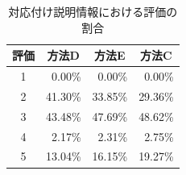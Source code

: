 \documentclass[submit]{ipsj}
\begin{document}

\begin{table}[t]
  \caption{対応付け説明情報における評価の割合}
  \label{table:対応付け説明情報における評価の割合}
  \centering
  \begin{tabular}{c|r|r|r}
  \hline
  評価 & \multicolumn{1}{c|}{方法D} & \multicolumn{1}{c|}{方法E} & \multicolumn{1}{c}{方法C} \\ \hline
  1  & 0.00\%                     & 0.00\%                     & 0.00\% \\
  2  & 41.30\%                    & 33.85\%                    & 29.36\% \\
  3  & 43.48\%                    & 47.69\%                    & 48.62\% \\
  4  & 2.17\%                     & 2.31\%                     & 2.75\% \\
  5  & 13.04\%                    & 16.15\%                    & 19.27\% \\ \hline
  \end{tabular}
\end{table}
\end{document}
